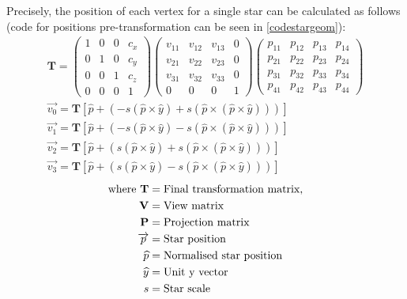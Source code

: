 Precisely, the position of each vertex for a single star can be calculated as follows (code for positions pre-transformation can be seen in \cref{codestargeom}):
\begin{align}
\mathbf{T}=\begin{pmatrix} 1 & 0 & 0 & c_x \\ 0 & 1 & 0 & c_y\\ 0 & 0 & 1 & c_z\\ 0 & 0 & 0 & 1 \end{pmatrix}\begin{pmatrix} v_{11} & v_{12} & v_{13} & 0 \\ v_{21} & v_{22} & v_{23} & 0\\ v_{31} & v_{32} & v_{33} & 0\\ 0 & 0 & 0 & 1 \end{pmatrix}\begin{pmatrix} p_{11} & p_{12} & p_{13} & p_{14} \\ p_{21} & p_{22} & p_{23} & p_{24}\\ p_{31} & p_{32} & p_{33} & p_{34}\\ p_{41} & p_{42} & p_{43} & p_{44} \end{pmatrix} \\
\overrightarrow{v_0}=\mathbf{T}[\widehat{p}+(-s(\widehat{p}\times\widehat{y})+s(\widehat{p}\times(\widehat{p}\times\widehat{y})))] \\
\overrightarrow{v_1}=\mathbf{T}[\widehat{p}+(-s(\widehat{p}\times\widehat{y})-s(\widehat{p}\times(\widehat{p}\times\widehat{y})))] \\
\overrightarrow{v_2}=\mathbf{T}[\widehat{p}+(s(\widehat{p}\times\widehat{y})+s(\widehat{p}\times(\widehat{p}\times\widehat{y})))] \\
\overrightarrow{v_3}=\mathbf{T}[\widehat{p}+(s(\widehat{p}\times\widehat{y})-s(\widehat{p}\times(\widehat{p}\times\widehat{y})))]
\end{align}
\vspace{-55pt} 
\singlespacing
\begin{align*}
\text{where}~\mathbf{T} &= \text{Final transformation matrix,} \notag\\
\mathbf{V} &= \text{View matrix} \notag\\
\mathbf{P} &= \text{Projection matrix} \notag\\
\overrightarrow{p} &= \text{Star position} \notag\\
\widehat{p} &= \text{Normalised star position} \notag\\
\widehat{y} &= \text{Unit y vector} \notag\\
s &= \text{Star scale}\notag
\end{align*}
\onehalfspacing
\vspace{-25pt} 

